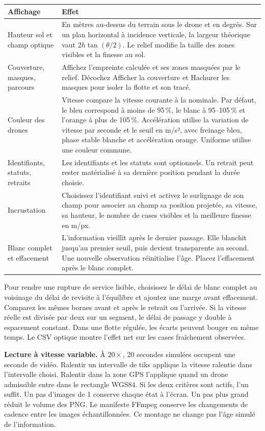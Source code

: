 \documentclass[11pt,a4paper]{article}
\newcommand{\ui}[1]{\textsf{#1}}
\begin{document}
\begin{tabularx}{\linewidth}{@{}p{.35\linewidth}Y@{}}
\toprule
Affichage & Effet \\
\midrule
Hauteur sol et champ optique & En mètres au-dessus du terrain sous le drone et en degrés. Sur un plan horizontal à incidence verticale, la largeur théorique vaut $2 h \tan(\theta/2)$. Le relief modifie la taille des zones visibles et la finesse au sol. \\
Couverture, masques, parcours & Affichez l'empreinte calculée et ses zones masquées par le relief. Décochez \ui{Afficher la couverture} et \ui{Hachurer les masques} pour isoler la flotte et son tracé. \\
Couleur des drones & \ui{Vitesse} compare la vitesse courante à la nominale. Par défaut, le bleu correspond à moins de 95\,\%, le blanc à 95–105\,\% et l'orange à plus de 105\,\%. \ui{Accélération} utilise la variation de vitesse par seconde et le seuil en m/s², avec freinage bleu, phase stable blanche et accélération orange. \ui{Uniforme} utilise une couleur commune. \\
Identifiants, statuts, retraits & Les identifiants et les statuts sont optionnels. Un retrait peut rester matérialisé à sa dernière position pendant la durée choisie. \\
Incrustation & Choisissez l'identifiant suivi et activez le surlignage de son champ pour associer au champ sa position projetée, sa vitesse, sa hauteur, le nombre de cases visibles et la meilleure finesse en m/px. \\
Blanc complet et effacement & L'information vieillit après le dernier passage. Elle blanchit jusqu'au premier seuil, puis devient transparente au second. Une nouvelle observation réinitialise l'âge. Placez l'effacement après le blanc complet. \\
\bottomrule
\end{tabularx}

Pour rendre une rupture de service lisible, choisissez le délai de blanc complet au voisinage du délai de revisite à l'équilibre et ajoutez une marge avant effacement. Comparez les mêmes bornes avant et après le retrait ou l'arrivée. Si la vitesse réelle est divisée par deux sur un segment, le délai de passage y double à espacement constant. Dans une flotte régulée, les écarts peuvent bouger en même temps. Le CSV optique montre l'effet net sur les cases fraîchement observées.

\textbf{Lecture à vitesse variable.} À $20\times$, 20 secondes simulées occupent une seconde de vidéo. \ui{Ralentir un intervalle de tiks} applique la vitesse ralentie dans l'intervalle choisi. \ui{Ralentir dans la zone GPS} l'applique quand un drone admissible entre dans le rectangle WGS84. Si les deux critères sont actifs, l'un suffit. Un pas d'images de 1 conserve chaque état à l'écran. Un pas plus grand réduit le volume des PNG. Le manifeste FFmpeg conserve les changements de cadence entre les images échantillonnées. Ce montage ne change pas l'âge simulé de l'information.
\end{document}

